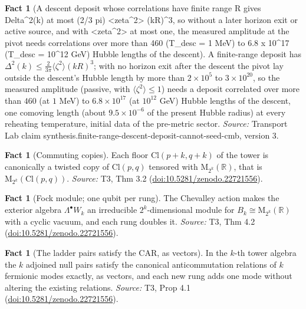 \documentclass[11pt]{article}
\theoremstyle{definition}
\newtheorem{fact}[theorem]{Fact}
\theoremstyle{plain}
\providecommand{\Cl}{}\renewcommand{\Cl}{\mathrm{Cl}}
\providecommand{\Mat}{}\renewcommand{\Mat}{\mathrm{M}}
\providecommand{\R}{}\renewcommand{\R}{\mathbb{R}}
\begin{document}
\begin{fact}[A descent deposit whose correlations have finite range R gives Delta\^{}2(k) at most (2/3 pi) <zeta\^{}2> (kR)\^{}3, so without a later horizon exit or active source, and with <zeta\^{}2> at most one, the measured amplitude at the pivot needs correlations over more than 460 (T\_desc = 1 MeV) to 6.8 x 10\^{}17 (T\_desc = 10\^{}12 GeV) Hubble lengths of the descent]\label{c:synthesis.finite-range-descent-deposit-cannot-seed-cmb}
A finite-range deposit has $\Delta^{2}(k) \le \tfrac{2}{3\pi}\langle\zeta^{2}\rangle(kR)^{3}$; with no horizon exit after the descent the pivot lay outside the descent's Hubble length by more than $2 \times 10^{5}$ to $3 \times 10^{20}$, so the measured amplitude (passive, with $\langle\zeta^{2}\rangle \le 1$) needs a deposit correlated over more than $460$ (at $1$ MeV) to $6.8 \times 10^{17}$ (at $10^{12}$ GeV) Hubble lengths of the descent, one comoving length (about $9.5 \times 10^{-6}$ of the present Hubble radius) at every reheating temperature, initial data of the pre-metric sector.
\emph{Source:} Transport Lab claim synthesis.finite-range-descent-deposit-cannot-seed-cmb, version 3.
\end{fact}

\begin{fact}[Commuting copies]\label{c:tower.commuting-copies}
Each floor $\Cl(p{+}k, q{+}k)$ of the tower is canonically a twisted copy of $\Cl(p,q)$ tensored with $\Mat_{2^k}(\R)$, that is $\Mat_{2^k}(\Cl(p,q))$.
\emph{Source:} T3, Thm 3.2 (\href{https://doi.org/10.5281/zenodo.22721556}{doi:10.5281/zenodo.22721556}).
\end{fact}

\begin{fact}[Fock module; one qubit per rung]\label{c:tower.fock-module-one-qubit-per-rung}
The Chevalley action makes the exterior algebra $\Lambda^\bullet W_k$ an irreducible $2^k$-dimensional module for $B_k \cong \Mat_{2^k}(\R)$ with a cyclic vacuum, and each rung doubles it.
\emph{Source:} T3, Thm 4.2 (\href{https://doi.org/10.5281/zenodo.22721556}{doi:10.5281/zenodo.22721556}).
\end{fact}

\begin{fact}[The ladder pairs satisfy the CAR, as vectors]\label{c:tower.ladder-pairs-satisfy-car-vectors}
In the $k$-th tower algebra the $k$ adjoined null pairs satisfy the canonical anticommutation relations of $k$ fermionic modes exactly, as vectors, and each new rung adds one mode without altering the existing relations.
\emph{Source:} T3, Prop 4.1 (\href{https://doi.org/10.5281/zenodo.22721556}{doi:10.5281/zenodo.22721556}).
\end{fact}
\end{document}

